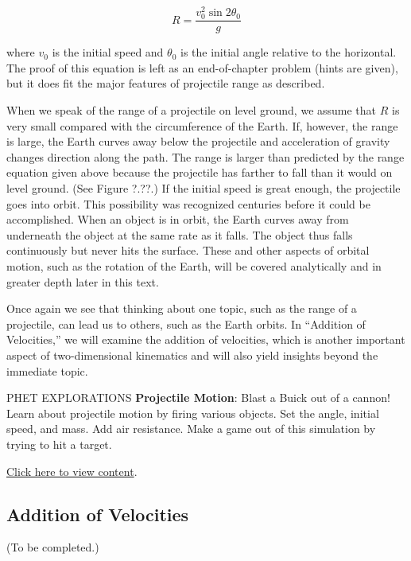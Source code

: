 \documentclass[../../main-ap-physics.tex]{subfiles}
\begin{document}
\begin{equation}
    R = \frac{v_0^2 \sin{2 \theta_0}}{g}
\end{equation}

where $v_0$ is the initial speed and $\theta_0$ is the initial angle relative to the horizontal. The proof of this equation is left as an end-of-chapter problem (hints are given), but it does fit the major features of projectile range as described.

\vspace{1em}

When we speak of the range of a projectile on level ground, we assume that $R$ is very small compared with the circumference of the Earth. If, however, the range is large, the Earth curves away below the projectile and acceleration of gravity changes direction along the path. The range is larger than predicted by the range equation given above because the projectile has farther to fall than it would on level ground. (See Figure ?.??.) If the initial speed is great enough, the projectile goes into orbit. This possibility was recognized centuries before it could be accomplished. When an object is in orbit, the Earth curves away from underneath the object at the same rate as it falls. The object thus falls continuously but never hits the surface. These and other aspects of orbital motion, such as the rotation of the Earth, will be covered analytically and in greater depth later in this text.

\vspace{1em}

Once again we see that thinking about one topic, such as the range of a projectile, can lead us to others, such as the Earth orbits. In ``Addition of Velocities,'' we will examine the addition of velocities, which is another important aspect of two-dimensional kinematics and will also yield insights beyond the immediate topic.

\begin{gradient}{PHET EXPLORATIONS}
    \textbf{Projectile Motion}: Blast a Buick out of a cannon! Learn about projectile motion by firing various objects. Set the angle, initial speed, and mass. Add air resistance. Make a game out of this simulation by trying to hit a target.   

    \vspace{1em}

    \href{https://phet.colorado.edu/sims/html/projectile-motion/latest/projectile-motion_all.html}{Click here to view content}.
\end{gradient}

\subsection{Addition of Velocities}

(To be completed.)
\end{document}
